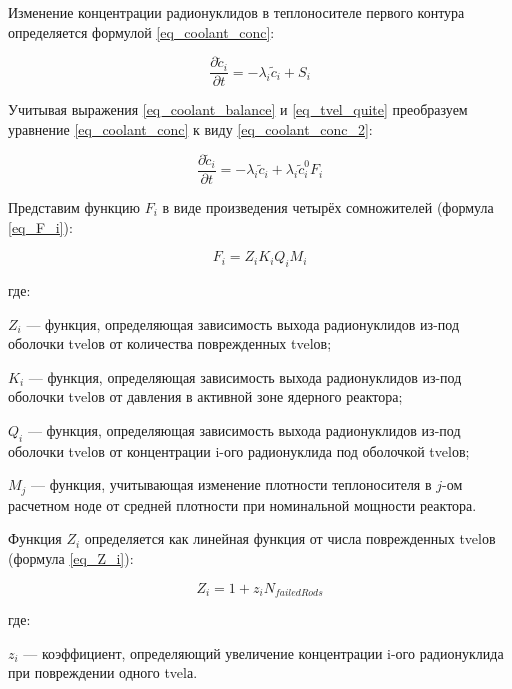 Изменение концентрации радионуклидов в теплоносителе первого контура определяется формулой \ref{eq_coolant_conc}:

\begin{equation}
    \label{eq_coolant_conc}
    \frac{\partial \widetilde{c}_{i}}{\partial t} = -\lambda_{i}\widetilde{c}_{i} + S_{i}
\end{equation}

Учитывая выражения \ref{eq_coolant_balance} и \ref{eq_tvel_quite} преобразуем уравнение \ref{eq_coolant_conc} к виду 
\ref{eq_coolant_conc_2}:

\begin{equation}
    \label{eq_coolant_conc_2}
    \frac{\partial \widetilde{c}_{i}}{\partial t} = -\lambda_{i}\widetilde{c}_{i} + \lambda_{i}\widetilde{c}_{i}^{0}F_{i}
\end{equation}

Представим функцию $F_{i}$ в виде произведения четырёх сомножителей (формула \ref{eq_F_i}):

\begin{equation}
    \label{eq_F_i}
    F_{i} = Z_{i}K_{i}Q_{i}M_{i}
\end{equation}

где:
\begin{description}
    \item $Z_{i}$ --- функция, определяющая зависимость выхода радионуклидов из-под оболочки \ac{tvel}ов от количества 
        поврежденных \ac{tvel}ов;
    \item $K_{i}$ --- функция, определяющая зависимость выхода радионуклидов из-под оболочки \ac{tvel}ов от давления в 
        активной зоне ядерного реактора;
    \item $Q_{i}$ --- функция, определяющая зависимость выхода радионуклидов из-под оболочки \ac{tvel}ов от концентрации 
        i-ого радионуклида под оболочкой \ac{tvel}ов;
    \item $M_{j}$ --- функция, учитывающая изменение плотности теплоносителя в $j$-ом расчетном ноде от средней 
        плотности при номинальной мощности реактора.
\end{description}

Функция $Z_{i}$ определяется как линейная функция от числа поврежденных \ac{tvel}ов (формула \ref{eq_Z_i}):

\begin{equation}
    \label{eq_Z_i}
    Z_{i} = 1 + z_{i}N_{failedRods}
\end{equation}

где:
\begin{description}
    \item $z_{i}$ --- коэффициент, определяющий увеличение концентрации  i-ого радионуклида при повреждении одного 
        \ac{tvel}а.
\end{description}

